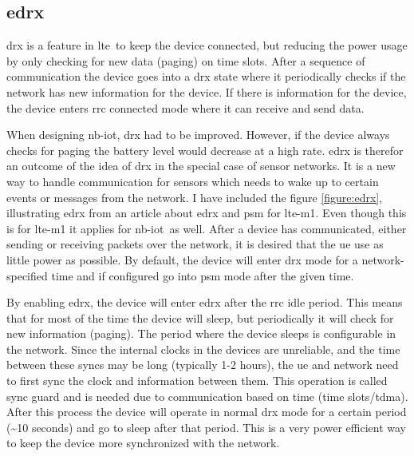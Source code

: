 \documentclass[USenglish]{ifimaster}  %
\begin{document}
\subsection[\acrlong{edrx}]{\acrfull{edrx}} \label{ssection:edrx}
\acrfull{drx} is a feature in \acrshort{lte} to keep the device connected, but reducing the power usage by only checking for new data (paging) on time slots. After a sequence of communication the device goes into a \acrshort{drx} state where it periodically checks if the network has new information for the device. If there is information for the device, the device enters \acrshort{rrc} connected mode where it can receive and send data.

When designing \acrshort{nb-iot}, \acrshort{drx} had to be improved. However, if the device always checks for paging the battery level would decrease at a high rate. \acrshort{edrx} is therefor an outcome of the idea of \acrshort{drx} in the special case of sensor networks. It is a new way to handle communication for sensors which needs to wake up to certain events or messages from the network. I have included the figure \vref{figure:edrx}, illustrating \acrshort{edrx} from an article about \acrshort{edrx} and \acrshort{psm} for \acrshort{lte-m1}. Even though this is for \acrshort{lte-m1} it applies for \acrshort{nb-iot} as well. After a device has communicated, either sending or receiving packets over the network, it is desired that the \acrshort{ue} use as little power as possible. By default, the device will enter \acrshort{drx} mode for a network-specified time and if configured go into \acrshort{psm} mode after the given time.

By enabling \acrshort{edrx}, the device will enter \acrshort{edrx} after the \acrshort{rrc} idle period. This means that for most of the time the device will sleep, but periodically it will check for new information (paging). The period where the device sleeps is configurable in the network. Since the internal clocks in the devices are unreliable, and the time between these syncs may be long (typically 1-2 hours), the \acrshort{ue} and network need to first sync the clock and information between them. This operation is called sync guard and is needed due to communication based on time (time slots/\acrlong{tdma}). After this process the device will operate in normal \acrshort{drx} mode for a certain period (\textasciitilde10 seconds) and go to sleep after that period. This is a very power efficient way to keep the device more synchronized with the network.
\end{document}
